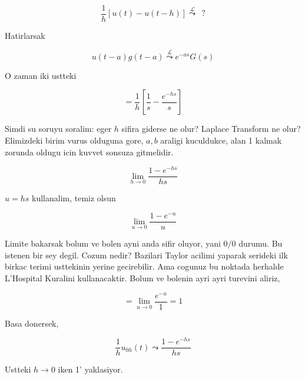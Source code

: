 \documentclass[12pt,fleqn]{article}
\begin{document}
\[ \frac{1}{h} [ u(t) - u(t-h) ] 
\stackrel{\mathcal{L}}{\leadsto} \ \ ?
\]

Hatirlarsak

\[ u(t-a)g(t-a) \stackrel{\mathcal{L}}{\leadsto}  e^{-as}G(s) \]

O zaman iki ustteki

\[ = \frac{1}{h}[ \frac{1}{s} - \frac{e^{-hs}}{s} ]\]

Simdi su soruyu soralim: eger $h$ sifira giderse ne olur? Laplace Transform
ne olur? Elimizdeki birim vurus olduguna gore, $a,b$ araligi kuculdukce,
alan 1 kalmak zorunda oldugu icin kuvvet sonsuza gitmelidir. 

\[ \lim_{h \to 0} \frac{1-e^{-hs}}{hs} \]

$u=hs$ kullanalim, temiz olsun 

\[ \lim_{u \to 0} \frac{1-e^{-u}}{u} \]

Limite bakarsak bolum ve bolen ayni anda sifir oluyor, yani $0/0$
durumu. Bu istenen bir sey degil. Cozum nedir? Bazilari Taylor acilimi
yaparak serideki ilk birkac terimi usttekinin yerine gecirebilir. Ama
cogunuz bu noktada herhalde L'Hospital Kuralini kullanacaktir. Bolum ve
bolenin ayri ayri turevini aliriz,

\[ = \lim_{u \to 0} \frac{e^{-u}}{1} = 1\]

Basa donersek, 

\[ \frac{1}{h}u_{0h}(t) \leadsto \frac{1-e^{-hs}}{hs} \]

Ustteki $h \to 0$ iken 1' yaklasiyor.  
\end{document}
